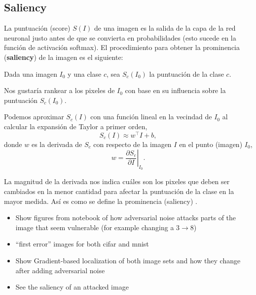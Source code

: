 \pagebreak
    
\subsection{Saliency}
La puntuación (score) $S(I)$ de una imagen es la salida de la capa de la red neuronal justo antes de que se convierta en probabilidades (esto sucede en la función de activación softmax). El procedimiento para obtener la prominencia (\textbf{saliency}) de la imagen es el siguiente:

\noindent
Dada una imagen $I_0$ y una clase $c$, sea $S_c(I_0)$ la puntuación de la clase $c$. 

\noindent
Nos gustaría rankear a los pixeles de $I_0$ con base en su influencia sobre la puntuación $S_c(I_0)$.

\noindent
Podemos aproximar $S_c(I)$ con una función lineal en la vecindad de $I_0$ al calcular la expansión de Taylor a primer orden,
\[S_c(I) \approx w^\top I + b,\]
donde $w$ es la derivada de $S_c$ con respecto de la imagen $I$ en el punto (imagen) $I_0$,
\[w = \left. \frac{\partial S_c}{\partial I} \right |_{I_0}.\]

\noindent
La magnitud de la derivada nos indica cuáles son los pixeles que deben ser cambiados en la menor cantidad para afectar la puntuación de la clase en la mayor medida. Así es como se define la prominencia (saliency) \cite{simonyan2014deep}.



\begin{itemize}
    \item Show figures from notebook of how adversarial noise attacks parts of the image that seem vulnerable (for example changing a 3$\to$8)
    \item ``first error'' images for both cifar and mnist
    \item Show Gradient-based localization of both image sets and how they change after adding adversarial noise\cite{Selvaraju_2019}
    \item See the saliency of an attacked image
\end{itemize}